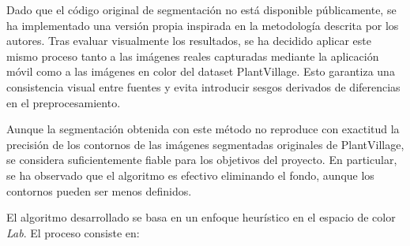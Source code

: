 \documentclass[11pt,spanish,listoffigures,listoftables]{tfgetsinf}
\begin{document}
Dado que el código original de segmentación no está disponible públicamente, se ha implementado una versión propia inspirada en la metodología descrita por los autores. Tras evaluar visualmente los resultados, se ha decidido aplicar este mismo proceso tanto a las imágenes reales capturadas mediante la aplicación móvil como a las imágenes en color del dataset PlantVillage. Esto garantiza una consistencia visual entre fuentes y evita introducir sesgos derivados de diferencias en el preprocesamiento.

Aunque la segmentación obtenida con este método no reproduce con exactitud la precisión de los contornos de las imágenes segmentadas originales de PlantVillage, se considera suficientemente fiable para los objetivos del proyecto. En particular, se ha observado que el algoritmo es efectivo eliminando el fondo, aunque los contornos pueden ser menos definidos.

El algoritmo desarrollado se basa en un enfoque heurístico en el espacio de color \textit{Lab}. El proceso consiste en:
\end{document}
